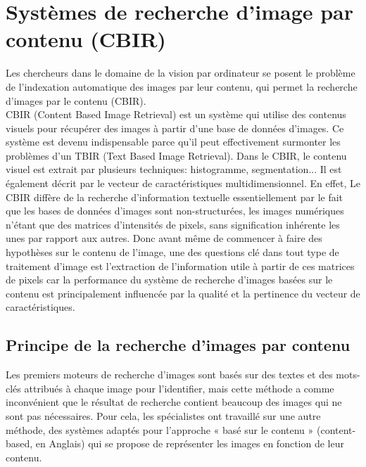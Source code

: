 \section{Systèmes de recherche d'image par contenu (CBIR)}
Les chercheurs dans le domaine de la vision par ordinateur se posent le problème de l'indexation automatique des images par leur contenu, qui permet la recherche d'images par le
contenu (CBIR).\\

CBIR (Content Based Image Retrieval) est un système qui utilise des contenus{\tiny } visuels pour récupérer des images à partir d'une base de données d'images. Ce système est devenu indispensable parce qu'il peut effectivement surmonter les problèmes d'un TBIR (Text Based Image Retrieval). Dans le CBIR, le contenu visuel est extrait par plusieurs techniques:
histogramme, segmentation... Il est également décrit par le vecteur de caractéristiques multidimensionnel. En effet, Le CBIR diffère de la recherche d’information textuelle essentiellement par le fait que les bases de données d’images sont non-structurées, les images numériques n'étant que des matrices d'intensités de pixels, sans signification inhérente les unes par rapport aux autres. Donc avant même de commencer à faire des hypothèses sur le contenu de l'image, une des questions clé dans tout type de traitement d’image est l’extraction de l’information utile à partir de ces matrices de pixels car la performance du système de recherche d'images basées sur le contenu est principalement influencée par la qualité et la pertinence du vecteur de caractéristiques. \\

\subsection{Principe de la recherche d’images par contenu}
Les premiers moteurs de recherche d’images sont basés sur des textes et des mots-clés attribués à chaque image pour l'identifier, mais cette méthode a comme inconvénient que le résultat de recherche contient beaucoup des images qui ne sont pas nécessaires. Pour cela, les spécialistes ont travaillé sur une autre méthode, des systèmes adaptés pour l'approche « basé sur le contenu » (content-based, en Anglais) qui se propose de représenter les images en fonction de leur contenu.\\

